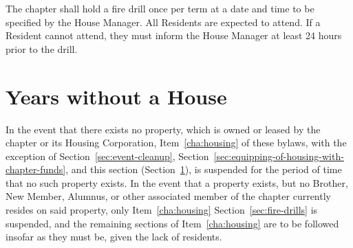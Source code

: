 The chapter shall hold a fire drill once per term at a date and time to be
specified by the House Manager.
All Residents are expected to attend.
If a Resident cannot attend, they must inform the House Manager at least 24
hours prior to the drill.

\section{Years without a House}
\label{sec:years-without-a-house}

In the event that there exists no property, which is owned or leased by the
chapter or its Housing Corporation, Item~\ref{cha:housing} of these bylaws,
with the exception of Section~\ref{sec:event-cleanup},
Section~\ref{sec:equipping-of-housing-with-chapter-funds}, and this section
(Section~\ref{sec:years-without-a-house}), is suspended for the period of time
that no such property exists.
In the event that a property exists, but no Brother, New Member, Alumnus, or
other associated member of the chapter currently resides on said property, only
Item~\ref{cha:housing} Section~\ref{sec:fire-drills} is suspended, and the
remaining sections of Item~\ref{cha:housing} are to be followed insofar as they
must be, given the lack of residents.

